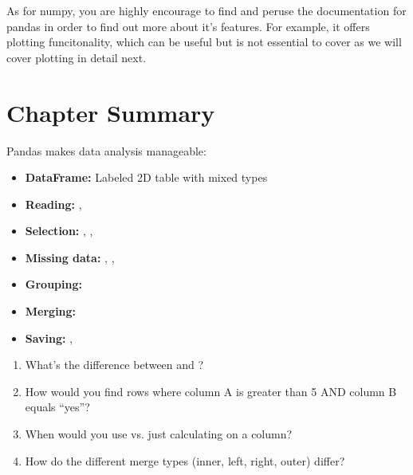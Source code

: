 \begin{tip}
As for numpy, you are highly encourage to find and peruse the documentation for pandas in order to find out more about it's features. For example, it offers plotting funcitonality, which can be useful but is not essential to cover as we will cover plotting in detail next.
\end{tip}

\section{Chapter Summary}
\label{sec:pandas-summary}

Pandas makes data analysis manageable:

\begin{itemize}
    \item \textbf{DataFrame:} Labeled 2D table with mixed types
    \item \textbf{Reading:} , 
    \item \textbf{Selection:} , , 
    \item \textbf{Missing data:} , , 
    \item \textbf{Grouping:} 
    \item \textbf{Merging:} 
    \item \textbf{Saving:} , 
\end{itemize}

\begin{ponder}
\begin{enumerate}
    \item What's the difference between  and ?
    \item How would you find rows where column A is greater than 5 AND column B equals ``yes''?
    \item When would you use  vs. just calculating  on a column?
    \item How do the different merge types (inner, left, right, outer) differ?
\end{enumerate}
\end{ponder}
